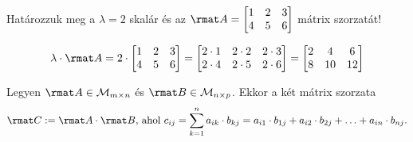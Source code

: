 \documentclass[a4paper, 12pt]{scrartcl}
\begin{document}
\begin{example}
  Határozzuk meg a $\lambda = 2$ skalár és az $\rmat A = \begin{bmatrix}
      1 & 2 & 3 \\
      4 & 5 & 6
    \end{bmatrix}$ mátrix szorzatát!

  $$
    \lambda \cdot \rmat A
    = 2 \cdot
    \begin{bmatrix}
      1 & 2 & 3 \\
      4 & 5 & 6
    \end{bmatrix}
    =
    \begin{bmatrix}
      2 \cdot 1 & 2 \cdot 2 & 2 \cdot 3 \\
      2 \cdot 4 & 2 \cdot 5 & 2 \cdot 6
    \end{bmatrix}
    =
    \begin{bmatrix}
      2 & 4  & 6  \\
      8 & 10 & 12
    \end{bmatrix}
  $$
\end{example}

\begin{definition}
  Legyen $\rmat A \in \mathcal M_{m \times n}$ és
  $\rmat B \in \mathcal M_{n \times p}$. Ekkor a két mátrix szorzata
  $$
    \rmat C := \rmat A \cdot \rmat B
    \text{, ahol }
    c_{ij}
    = \sum_{k=1}^{n} a_{ik} \cdot b_{kj}
    = a_{i1} \cdot b_{1j} + a_{i2} \cdot b_{2j} + \ldots + a_{in} \cdot b_{nj}
    \text.
  $$
\end{definition}
\end{document}
